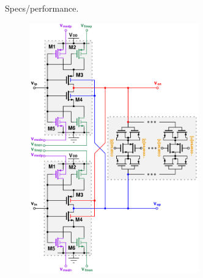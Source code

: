 \documentclass[t, screen, aspectratio=43]{beamer}
\begin{document}
\begin{frame}
\begin{block}{Specs/performance.}
\begin{minipage}{6cm}
		\end{minipage}%
		\begin{minipage}{6cm}
			\begin{figure}[htb!]
			        \centering
			        \includegraphics[width=0.65\textwidth, angle=0]{telescopic_pseudodiff_delay_cell_all_tune2}
			\end{figure}
		\end{minipage}%

	\end{block}	
\end{frame}




\end{document}
